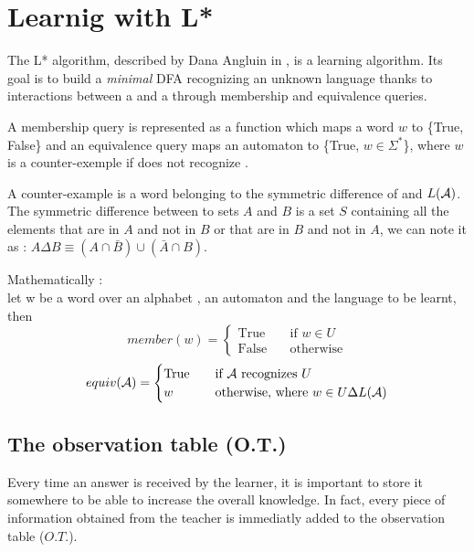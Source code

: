 \section{Learnig with L* }

The L* algorithm, described by Dana Angluin in \cite{LPaper}, is a learning algorithm. Its goal is to build a \textit{minimal} DFA recognizing an unknown language \langU{} thanks to interactions between a \learner{} and a \teacher{} through membership and equivalence queries.

\begin{definition}
  A membership query is represented as a function which maps a word $w$ to \{True, False\} and an equivalence query maps an automaton \automaton{} to \{True, $w \in \Sigma^*$\}, where $w$ is a counter-exemple if \automaton{} does not recognize \langU{}.
\end{definition}

\begin{definition}
  A counter-example is a word belonging to the symmetric difference of \langU{} and $L(\mathcal{A}{})$. The symmetric difference between to sets $A$ and $B$ is a set $S$ containing all the elements that are in $A$ and not in $B$ or that are in $B$ and not in $A$, we can note it as : $A \Delta B \equiv (A \cap \bar{B}) \cup (\bar{A} \cap B)$.
\end{definition}

Mathematically :\\
let w be a word over an alphabet \alphabet{}, \automaton{} an automaton and \langU{} the language to be learnt, then
\[ member(w) =
  \begin{cases}
    \text{True}  & \quad \text{if } w \in U \\
    \text{False} & \quad \text{otherwise}
  \end{cases}
\]
\[ equiv(\mathcal{A}{}) =
  \begin{cases}
    \text{True} & \quad \text{if } \mathcal{A}{} \text{ recognizes } U           \\
    w           & \quad \text{otherwise, where } w \in U \Delta L(\mathcal{A}{})
  \end{cases}
\]


\subsection{The observation table (O.T.)}
Every time an answer is received by the learner, it is important to store it somewhere to be able to increase the overall knowledge. In fact, every piece of information obtained from the teacher is immediatly added to the observation table ($O.T.$).

